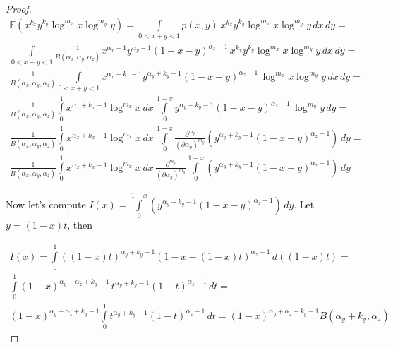 \documentclass{article}
\begin{document}
\begin{theorem}
\begin{proof}
		\begin{multline*}
		\mathbb{E}(x^{k_x} y^{k_y} \log^{m_x} x \log^{m_y} y) = \int\limits_{0 < x + y < 1} {p(x, y) \, x^{k_x} y^{k_y} \log^{m_x} x \log^{m_y} y \, dx \, dy} = 
		\\ \int\limits_{0 < x + y < 1} {\frac{1}{B(\alpha_x, \alpha_y, \alpha_z)} x^{\alpha_x - 1} y^{\alpha_y - 1} (1 - x - y)^{\alpha_z - 1} \, x^{k_x} y^{k_y} \log^{m_x} x \log^{m_y} y \, dx \, dy} = 
		\\ \frac{1}{B(\alpha_x, \alpha_y, \alpha_z)} \int\limits_{0 < x + y < 1} { x^{\alpha_x + k_x - 1} y^{\alpha_y + k_y - 1} (1 - x - y)^{\alpha_z - 1} \, \log^{m_x} x \log^{m_y} y \, dx \, dy} = 
		\\ \frac{1}{B(\alpha_x, \alpha_y, \alpha_z)} \int\limits_0^1 { x^{\alpha_x + k_x - 1} \log^{m_x}{x} \, dx \, \int\limits_0^{1-x}{ y^{\alpha_y + k_y - 1} (1 - x - y)^{\alpha_z - 1} \, \log^{m_y} y \, dy}} = 
		\\  \frac{1}{B(\alpha_x, \alpha_y, \alpha_z)} \int\limits_0^1 { x^{\alpha_x + k_x - 1} \log^{m_x}{x} \, dx \, \int\limits_0^{1-x}{ \frac{\partial^{m_y}}{(\partial \alpha_y)^{m_y}} (y^{\alpha_y + k_y - 1} (1 - x - y)^{\alpha_z - 1}) \, dy}} = 
		\\ \frac{1}{B(\alpha_x, \alpha_y, \alpha_z)} \int\limits_0^1 { x^{\alpha_x + k_x - 1} \log^{m_x}{x} \, dx \, \frac{\partial^{m_y}}{(\partial \alpha_y)^{m_y}} \int\limits_0^{1-x}{  (y^{\alpha_y + k_y - 1} (1 - x - y)^{\alpha_z - 1}) \, dy}} 
		\end{multline*}
		
		Now let's compute $I(x) = \int\limits_0^{1-x}{  (y^{\alpha_y + k_y - 1} (1 - x - y)^{\alpha_z - 1}) \, dy} $. Let $y = (1 - x)t$, then
		
		\begin{multline*}
		I(x) = \int\limits_0^1{((1 - x)t)^{\alpha_y + k_y - 1} (1 - x - (1 - x)t)^{\alpha_z - 1} \, d((1 - x)t)} = \\ \int\limits_0^1{(1 - x)^{\alpha_y + \alpha_z + k_y - 1} \, t^{\alpha_y + k_y - 1} (1 - t)^{\alpha_z - 1} \, dt} = \\ (1 - x)^{\alpha_y + \alpha_z + k_y - 1} \int\limits_0^1{t^{\alpha_y + k_y - 1} (1 - t)^{\alpha_z - 1} \, dt} = (1 - x)^{\alpha_y + \alpha_z + k_y - 1} B(\alpha_y + k_y, \alpha_z)
		\end{multline*}
		

\end{proof}
\end{theorem}
\end{document}
